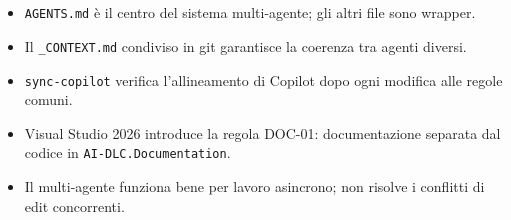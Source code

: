 \section*{\LabelSummary}

\begin{itemize}
  \item \texttt{AGENTS.md} è il centro del sistema multi-agente; gli altri file sono wrapper.
  \item Il \texttt{\_CONTEXT.md} condiviso in git garantisce la coerenza tra agenti diversi.
  \item \texttt{sync-copilot} verifica l'allineamento di Copilot dopo ogni modifica alle regole comuni.
  \item Visual Studio 2026 introduce la regola DOC-01: documentazione separata dal codice in \texttt{AI-DLC.Documentation}.
  \item Il multi-agente funziona bene per lavoro asincrono; non risolve i conflitti di edit concorrenti.
\end{itemize}
